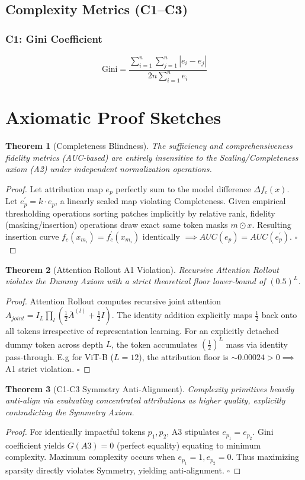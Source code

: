 \documentclass[10pt,journal,compsoc]{IEEEtran}
\newtheorem{theorem}{Theorem}
\begin{document}
\subsection{Complexity Metrics (C1--C3)}
\subsubsection{C1: Gini Coefficient}
\[
    \text{Gini} = \frac{\sum_{i=1}^n \sum_{j=1}^n |e_i - e_j|}{2n \sum_{i=1}^n e_i}
\]

\section{Axiomatic Proof Sketches}

\begin{theorem}[Completeness Blindness]
The sufficiency and comprehensiveness fidelity metrics (AUC-based) are entirely insensitive to the Scaling/Completeness axiom (A2) under independent normalization operations.
\end{theorem}
\begin{proof}
Let attribution map $e_{p}$ perfectly sum to the model difference $\Delta f_c(x)$. Let $e^{\prime}_{p} = k \cdot e_{p}$, a linearly scaled map violating Completeness. Given empirical thresholding operations sorting patches implicitly by relative rank, fidelity (masking/insertion) operations draw exact same token masks $m \odot x$. Resulting insertion curve $f_c(x_{m_i}) = f^{\prime}_c(x_{m_i})$ identically $\implies AUC(e_p) = AUC(e^{\prime}_p)$. $\square$
\end{proof}

\begin{theorem}[Attention Rollout A1 Violation]
Recursive Attention Rollout violates the Dummy Axiom with a strict theoretical floor lower-bound of $(0.5)^L$.
\end{theorem}
\begin{proof}
Attention Rollout computes recursive joint attention $A_{joint} = I_{L} \prod_{l} (\frac{1}{2}\bar{A}^{(l)} + \frac{1}{2}I)$. The identity addition explicitly maps $\frac{1}{2}$ back onto all tokens irrespective of representation learning. For an explicitly detached dummy token across depth $L$, the token accumulates $(\frac{1}{2})^L$ mass via identity pass-through. E.g for ViT-B ($L=12$), the attribution floor is $\sim 0.00024 > 0 \implies$ A1 strict violation. $\square$
\end{proof}

\begin{theorem}[C1-C3 Symmetry Anti-Alignment]
Complexity primitives heavily anti-align via evaluating concentrated attributions as higher quality, explicitly contradicting the Symmetry Axiom.
\end{theorem}
\begin{proof}
For identically impactful tokens $p_1, p_2$, A3 stipulates $e_{p_1} = e_{p_2}$. Gini coefficient yields $G(A3) = 0$ (perfect equality) equating to minimum complexity. Maximum complexity occurs when $e_{p_1}=1, e_{p_2}=0$. Thus maximizing sparsity directly violates Symmetry, yielding anti-alignment. $\square$
\end{proof}
\end{document}
